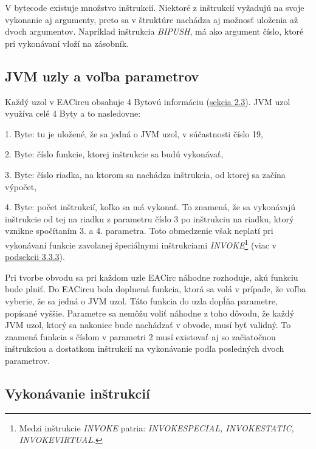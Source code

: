 V bytecode existuje množstvo inštrukcií. Niektoré z inštrukcií vyžadujú na svoje vykonanie aj argumenty, preto sa v štruktúre nachádza aj možnosť uloženia až dvoch argumentov. Napríklad inštrukcia \textit{BIPUSH}, má ako argument číslo, ktoré pri vykonávaní vloží na zásobník.

\subsection{JVM uzly a voľba parametrov}
\label{subsec:jvm-nodes}

Každý uzol v EACircu obsahuje 4 Bytovú informáciu (\hyperref[sec:nodes]{sekcia 2.3}). JVM uzol využíva celé 4 Byty a to nasledovne: \vspace{0pt}

\begin{myItemize}
	\item 1. Byte: tu je uložené, že sa jedná o JVM uzol, v súčastnosti číslo 19,
	\item 2. Byte: číslo funkcie, ktorej inštrukcie sa budú vykonávať,
	\item 3. Byte: číslo riadka, na ktorom sa nachádza inštrukcia, od ktorej sa začína výpočet,
	\item 4. Byte: počet inštrukcií, koľko sa má vykonať. To znamená, že sa vykonávajú inštrukcie od tej na riadku z parametru číslo 3 po inštrukciu na riadku, ktorý vznikne spočítaním 3. a 4. parametra. Toto obmedzenie však neplatí pri vykonávaní funkcie zavolanej špeciálnymi inštrukciami \textit{INVOKE}\footnote{Medzi inštrukcie \textit{INVOKE} patria: \textit{INVOKESPECIAL, INVOKESTATIC, INVOKEVIRTUAL}.} (viac v \hyperref[subsec:emulating-ins]{podsekcii 3.3.3}). 
\end{myItemize}

Pri tvorbe obvodu sa pri každom uzle EACirc náhodne rozhoduje, akú funkciu bude plniť. Do EACircu bola doplnená funkcia, ktorá sa volá v prípade, že voľba vyberie, že sa jedná o JVM uzol. Táto funkcia do uzla dopĺňa parametre, popísané vyššie. Parametre sa nemôžu voliť náhodne z toho dôvodu, že každý JVM uzol, ktorý sa nakoniec bude nachádzať v obvode, musí byť validný. To znamená funkcia s číslom v parametri 2 musí existovať aj so začiatočnou inštrukciou a dostatkom inštrukcií na vykonávanie podľa posledných dvoch parametrov.

\subsection{Vykonávanie inštrukcií} 
\label{subsec:emulating-ins}

